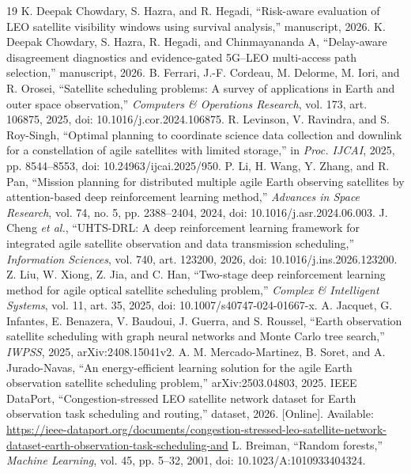 \documentclass[conference]{IEEEtran}
\begin{document}
\begin{thebibliography}{19}
 K. Deepak Chowdary, S. Hazra, and R. Hegadi, ``Risk-aware evaluation of LEO satellite visibility windows using survival analysis,'' manuscript, 2026.
 K. Deepak Chowdary, S. Hazra, R. Hegadi, and Chinmayananda A, ``Delay-aware disagreement diagnostics and evidence-gated 5G--LEO multi-access path selection,'' manuscript, 2026.
 B. Ferrari, J.-F. Cordeau, M. Delorme, M. Iori, and R. Orosei, ``Satellite scheduling problems: A survey of applications in Earth and outer space observation,'' \emph{Computers \& Operations Research}, vol. 173, art. 106875, 2025, doi: 10.1016/j.cor.2024.106875.
 R. Levinson, V. Ravindra, and S. Roy-Singh, ``Optimal planning to coordinate science data collection and downlink for a constellation of agile satellites with limited storage,'' in \emph{Proc. IJCAI}, 2025, pp. 8544--8553, doi: 10.24963/ijcai.2025/950.
 P. Li, H. Wang, Y. Zhang, and R. Pan, ``Mission planning for distributed multiple agile Earth observing satellites by attention-based deep reinforcement learning method,'' \emph{Advances in Space Research}, vol. 74, no. 5, pp. 2388--2404, 2024, doi: 10.1016/j.asr.2024.06.003.
 J. Cheng \emph{et al.}, ``UHTS-DRL: A deep reinforcement learning framework for integrated agile satellite observation and data transmission scheduling,'' \emph{Information Sciences}, vol. 740, art. 123200, 2026, doi: 10.1016/j.ins.2026.123200.
 Z. Liu, W. Xiong, Z. Jia, and C. Han, ``Two-stage deep reinforcement learning method for agile optical satellite scheduling problem,'' \emph{Complex \& Intelligent Systems}, vol. 11, art. 35, 2025, doi: 10.1007/s40747-024-01667-x.
 A. Jacquet, G. Infantes, E. Benazera, V. Baudoui, J. Guerra, and S. Roussel, ``Earth observation satellite scheduling with graph neural networks and Monte Carlo tree search,'' \emph{IWPSS}, 2025, arXiv:2408.15041v2.
 A. M. Mercado-Martinez, B. Soret, and A. Jurado-Navas, ``An energy-efficient learning solution for the agile Earth observation satellite scheduling problem,'' arXiv:2503.04803, 2025.
 IEEE DataPort, ``Congestion-stressed LEO satellite network dataset for Earth observation task scheduling and routing,'' dataset, 2026. [Online]. Available: \url{https://ieee-dataport.org/documents/congestion-stressed-leo-satellite-network-dataset-earth-observation-task-scheduling-and}
 L. Breiman, ``Random forests,'' \emph{Machine Learning}, vol. 45, pp. 5--32, 2001, doi: 10.1023/A:1010933404324.

\end{thebibliography}
\end{document}

